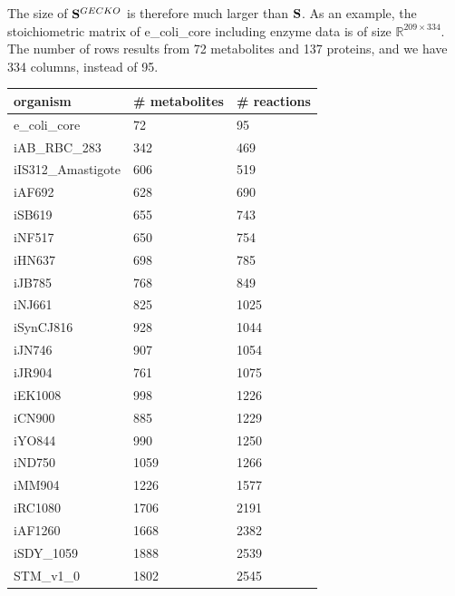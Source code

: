 The size of $\bold S^{GECKO}$ is therefore much larger than $\bold S$.
As an example, the stoichiometric matrix of \textsf{e\_coli\_core} including enzyme data is of size $\mathbb{R}^{209 \times 334}$. The number of rows results from 72 metabolites and 137 proteins, and we have 334 columns, instead of 95. 
\begin{table}[!ht]
    \centering
    \begin{tabular}{lll}
    \hline
        \textbf{organism} & \textbf{\# metabolites} & \textbf{\# reactions} \\ \hline
        e\_coli\_core & 72 & 95 \\ \hline
        iAB\_RBC\_283 & 342 & 469 \\ \hline
        iIS312\_Amastigote & 606 & 519 \\ \hline
        iAF692 & 628 & 690 \\ \hline
        iSB619 & 655 & 743 \\ \hline
        iNF517 & 650 & 754 \\ \hline
        iHN637 & 698 & 785 \\ \hline
        iJB785 & 768 & 849 \\ \hline
        iNJ661 & 825 & 1025 \\ \hline
        iSynCJ816 & 928 & 1044 \\ \hline
        iJN746 & 907 & 1054 \\ \hline
        iJR904 & 761 & 1075 \\ \hline
        iEK1008 & 998 & 1226 \\ \hline
        iCN900 & 885 & 1229 \\ \hline
        iYO844 & 990 & 1250 \\ \hline
        iND750 & 1059 & 1266 \\ \hline
        iMM904 & 1226 & 1577 \\ \hline
        iRC1080 & 1706 & 2191 \\ \hline
        iAF1260 & 1668 & 2382 \\ \hline
        iSDY\_1059 & 1888 & 2539 \\ \hline
        STM\_v1\_0 & 1802 & 2545 \\ \hline

\end{tabular}
\end{table}
